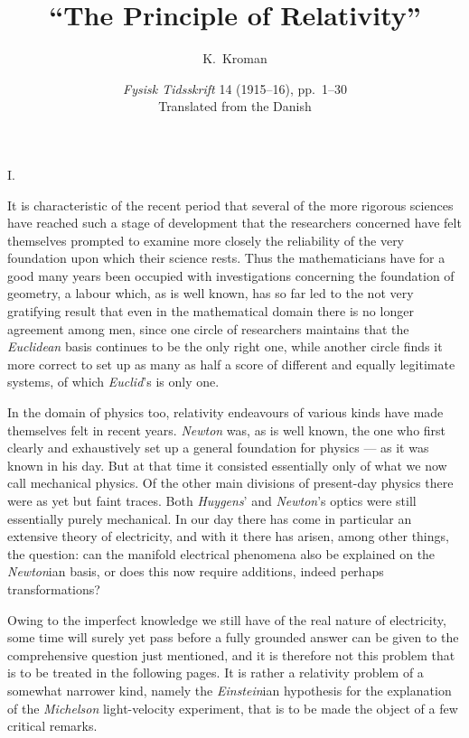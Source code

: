 \documentclass[12pt,a4paper]{article}
\title{\textbf{``The Principle of Relativity''}}
\author{K.\ Kroman}
\date{\textit{Fysisk Tidsskrift} 14 (1915--16), pp.~1--30\\[2pt]
\small Translated from the Danish}
\begin{document}
\maketitle

\begin{center}
I.
\end{center}

It is characteristic of the recent period that several of the more rigorous
sciences have reached such a stage of development that the researchers
concerned have felt themselves prompted to examine more closely the
reliability of the very foundation upon which their science rests. Thus the
mathematicians have for a good many years been occupied with investigations
concerning the foundation of geometry, a labour which, as is well known, has
so far led to the not very gratifying result that even in the mathematical
domain there is no longer agreement among men, since one circle of researchers
maintains that the \emph{Euclidean} basis continues to be the only right one,
while another circle finds it more correct to set up as many as half a score
of different and equally legitimate systems, of which \emph{Euclid}'s is only
one.

In the domain of physics too, relativity endeavours of various kinds have made
themselves felt in recent years. \emph{Newton} was, as is well known, the one
who first clearly and exhaustively set up a general foundation for physics ---
as it was known in his day. But at that time it consisted essentially only of
what we now call mechanical physics. Of the other main divisions of
present-day physics there were as yet but faint traces. Both \emph{Huygens}'
and \emph{Newton}'s optics were still essentially purely mechanical. In our
day there has come in particular an extensive theory of electricity, and with
it there has arisen, among other things, the question: can the manifold
electrical phenomena also be explained on the \emph{Newton}ian basis, or does
this now require additions, indeed perhaps transformations?

Owing to the imperfect knowledge we still have of the real nature of
electricity, some time will surely yet pass before a fully grounded answer can
be given to the comprehensive question just mentioned, and it is therefore not
this problem that is to be treated in the following pages. It is rather a
relativity problem of a somewhat narrower kind, namely the \emph{Einstein}ian
hypothesis for the explanation of the \emph{Michelson} light-velocity
experiment, that is to be made the object of a few critical remarks.
\end{document}
